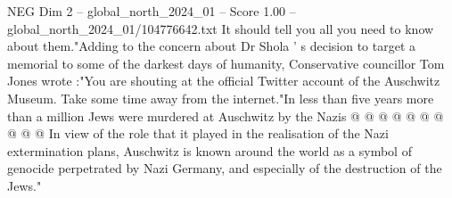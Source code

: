 \begin{textsample}{NEG Dim 2 – global\_north\_2024\_01 – Score 1.00 – global\_north\_2024\_01/104776642.txt}
It should tell you all you need to know about them."Adding to the concern about Dr Shola ' s decision to target a memorial to some of the darkest days of humanity, Conservative councillor Tom Jones wrote :"You are shouting at the official Twitter account of the Auschwitz Museum.
Take some time away from the internet."In less than five years more than a million Jews were murdered at Auschwitz by the Nazis @ @ @ @ @ @ @ @ @ @ In view of the role that it played in the realisation of the Nazi extermination plans, Auschwitz is known around the world as a symbol of genocide perpetrated by Nazi Germany, and especially of the destruction of the Jews."

\end{textsample}
